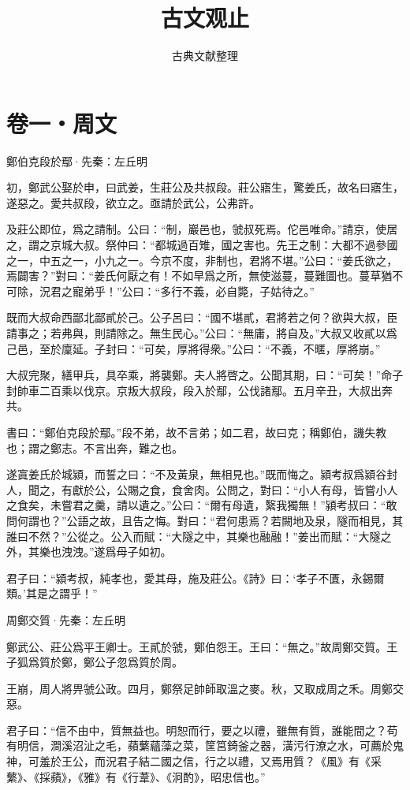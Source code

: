 \documentclass[12pt,a4paper]{ctexbook}
\title{古文观止}
\author{古典文献整理}
\date{}
\begin{document}
\maketitle
\tableofcontents
\newpage
\section{卷一・周文}
鄭伯克段於鄢·先秦：左丘明 \par
初，鄭武公娶於申，曰武姜，生莊公及共叔段。莊公寤生，驚姜氏，故名曰寤生，遂惡之。愛共叔段，欲立之。亟請於武公，公弗許。\par
及莊公即位，爲之請制。公曰：“制，巖邑也，虢叔死焉。佗邑唯命。”請京，使居之，謂之京城大叔。祭仲曰：“都城過百雉，國之害也。先王之制：大都不過參國之一，中五之一，小九之一。今京不度，非制也，君將不堪。”公曰：“姜氏欲之，焉闢害？”對曰：“姜氏何厭之有！不如早爲之所，無使滋蔓，蔓難圖也。蔓草猶不可除，況君之寵弟乎！”公曰：“多行不義，必自斃，子姑待之。”\par
既而大叔命西鄙北鄙貳於己。公子呂曰：“國不堪貳，君將若之何？欲與大叔，臣請事之；若弗與，則請除之。無生民心。”公曰：“無庸，將自及。”大叔又收貳以爲己邑，至於廩延。子封曰：“可矣，厚將得衆。”公曰：“不義，不暱，厚將崩。”\par
大叔完聚，繕甲兵，具卒乘，將襲鄭。夫人將啓之。公聞其期，曰：“可矣！”命子封帥車二百乘以伐京。京叛大叔段，段入於鄢，公伐諸鄢。五月辛丑，大叔出奔共。\par
書曰：“鄭伯克段於鄢。”段不弟，故不言弟；如二君，故曰克；稱鄭伯，譏失教也；謂之鄭志。不言出奔，難之也。\par
遂寘姜氏於城潁，而誓之曰：“不及黃泉，無相見也。”既而悔之。潁考叔爲潁谷封人，聞之，有獻於公，公賜之食，食舍肉。公問之，對曰：“小人有母，皆嘗小人之食矣，未嘗君之羹，請以遺之。”公曰：“爾有母遺，繄我獨無！”潁考叔曰：“敢問何謂也？”公語之故，且告之悔。對曰：“君何患焉？若闕地及泉，隧而相見，其誰曰不然？”公從之。公入而賦：“大隧之中，其樂也融融！”姜出而賦：“大隧之外，其樂也洩洩。”遂爲母子如初。\par
君子曰：“潁考叔，純孝也，愛其母，施及莊公。《詩》曰：‘孝子不匱，永錫爾類。’其是之謂乎！”\par
周鄭交質·先秦：左丘明 \par
鄭武公、莊公爲平王卿士。王貳於虢，鄭伯怨王。王曰：“無之。”故周鄭交質。王子狐爲質於鄭，鄭公子忽爲質於周。\par
王崩，周人將畀虢公政。四月，鄭祭足帥師取溫之麥。秋，又取成周之禾。周鄭交惡。\par
君子曰：“信不由中，質無益也。明恕而行，要之以禮，雖無有質，誰能間之？苟有明信，澗溪沼沚之毛，蘋蘩蘊藻之菜，筐筥錡釜之器，潢污行潦之水，可薦於鬼神，可羞於王公，而況君子結二國之信，行之以禮，又焉用質？《風》有《采蘩》、《採蘋》，《雅》有《行葦》、《泂酌》，昭忠信也。”\par
\end{document}
